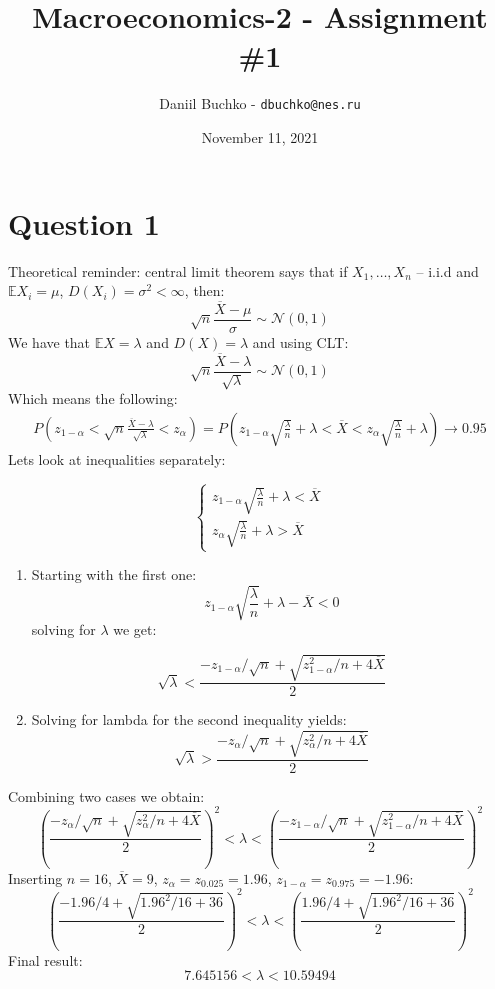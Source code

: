 \documentclass[11pt, oneside]{article}
\title{Macroeconomics-2 - Assignment \#1}
\author{Daniil Buchko - \texttt{dbuchko@nes.ru}}
\date{November 11, 2021}
\newcommand{\E}{\mathbb{E}}
\begin{document}
\maketitle



\section*{Question 1}

Theoretical reminder: central limit theorem says that if $ X_{1}, \dots, X_{n} $ -- i.i.d and $ \E X_{i} = \mu $, $ D(X_{i}) = \sigma^{2} < \infty $, then:
\[
\sqrt{n}\frac{\overline{X} - \mu}{\sigma} \sim \mathcal{N} (0, 1)
\]
We have that $ \E X = \lambda $ and $ D(X)  = \lambda $ and using CLT:
\[
\sqrt{n}\frac{\overline{X} - \lambda}{\sqrt{\lambda}} \sim \mathcal{N} (0, 1)
\]
Which means the following:
\begin{gather*}
	P \left( z_{1 - \alpha} < \sqrt{n}\frac{\overline{X} - \lambda}{\sqrt{\lambda}} < z_{\alpha} \right) = P \left( z_{1-\alpha}\sqrt{\frac{\lambda }{n}} + \lambda  < \overline{X} < z_{\alpha}\sqrt{\frac{\lambda }{n}} + \lambda \right) \to 0.95
\end{gather*}
Lets look at inequalities separately:

\[
\begin{cases}
 z_{1-\alpha}\sqrt{\frac{\lambda }{n}} + \lambda  < \overline{X} \\
z_{\alpha}\sqrt{\frac{\lambda }{n}} + \lambda > \overline{X} 
\end{cases}
\]

\begin{enumerate}
	\item Starting with the first one:
	\[
	z_{1-\alpha}\sqrt{\frac{\lambda }{n}} + \lambda - \overline{X} < 0
	\]
	solving for $ \lambda $ we get:
	
	\[
	\sqrt{\lambda} < \frac{-z_{1-\alpha} / \sqrt{n} + \sqrt{z^{2}_{1-\alpha} / n + 4\overline{X}} }{2}
	\]
	\item Solving for lambda for the second inequality yields:
	\[
	\sqrt{\lambda} > \frac{-z_{\alpha} / \sqrt{n} + \sqrt{z^{2}_{\alpha} / n + 4\overline{X}} }{2}
	\]	
\end{enumerate}
Combining two cases we obtain:
\[
\left( \frac{-z_{\alpha} / \sqrt{n} + \sqrt{z^{2}_{\alpha} / n + 4\overline{X}} }{2} \right)^{2} < \lambda < \left( \frac{-z_{1-\alpha} / \sqrt{n} + \sqrt{z^{2}_{1-\alpha} / n + 4\overline{X}} }{2} \right)^{2}
\]
Inserting $ n =  16$, $ \overline{X}  = 9 $, $ z_{\alpha} = z_{0.025} = 1.96 $, $ z_{1-\alpha} = z_{0.975} = -1.96 $:
\[
\left( \frac{-1.96 / 4 + \sqrt{1.96^{2} / 16 + 36} }{2} \right)^{2} < \lambda < \left( \frac{1.96 / 4 + \sqrt{1.96^{2} / 16 + 36} }{2} \right)^{2}
\]
Final result:
\[
7.645156 < \lambda < 10.59494
\]
\end{document}
